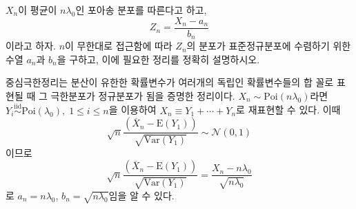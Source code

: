 \documentclass[answers]{exam}
\begin{document}
\begin{questions}
   $X_{n}$이 평균이 $n\lambda_{0}$인 포아송 분포를 따른다고 하고,
   $$
    Z_{n}=\dfrac{X_{n}-a_{n}}{b_{n}}
   $$
   이라고 하자. $n$이 무한대로 접근함에 따라 $Z_{n}$의 분포가 표준정규분포에 수렴하기 위한 수열 $a_{n}$과 $b_{n}$을 구하고, 이에 필요한 정리를 정확히 설명하시오.
   \begin{solution}
    중심극한정리는 분산이 유한한 확률변수가 여러개의 독립인 확률변수들의 합 꼴로 표현될 때 그 극한분포가 정규분포가 됨을 증명한 정리이다. $X_{n}\sim \mathrm{Poi}\left(n\lambda_{0}\right)$라면 $Y_{i}\overset{\text{iid}}{\sim} \mathrm{Poi}\left(\lambda_{0}\right),\; 1\leq i \leq n$을 이용하여 $X_{n}\equiv Y_{1}+\cdots+Y_{n}$로 재표현할 수 있다. 이때
    $$
      \sqrt{n}\dfrac{\left(\overline{X}_{n} -\mathrm{E}\left(Y_{1}\right)\right)}{\sqrt{\mathrm{Var}\left(Y_{1}\right)}}\sim \mathcal{N}\left(0,1\right)
    $$
    이므로 
    $$
      \sqrt{n}\dfrac{\left(\overline{X}_{n} -\mathrm{E}\left(Y_{1}\right)\right)}{\sqrt{\mathrm{Var}\left(Y_{1}\right)}} = \dfrac{X_{n}-n\lambda_{0}}{\sqrt{n\lambda_{0}}}
    $$
    로 $a_{n}=n\lambda_{0}$, $b_{n}=\sqrt{n\lambda_{0}}$임을 알 수 있다.
   \end{solution}
\end{questions}
\end{document}
